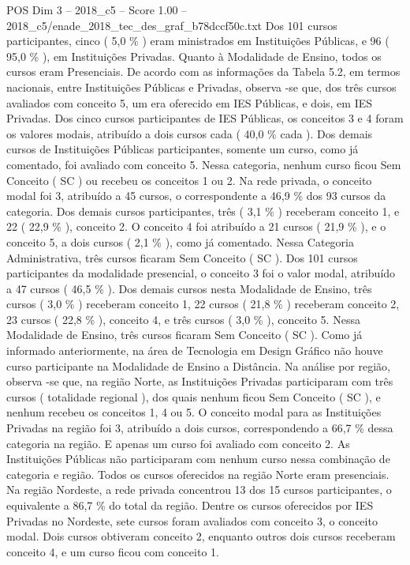 \begin{textsample}{POS Dim 3 – 2018\_c5 – Score 1.00 – 2018\_c5/enade\_2018\_tec\_des\_graf\_b78dccf50c.txt}
Dos 101 cursos participantes, cinco ( 5,0 \% ) eram ministrados em Instituições Públicas, e 96 ( 95,0 \% ), em Instituições Privadas.
Quanto à Modalidade de Ensino, todos os cursos eram Presenciais.
De acordo com as informações da Tabela 5.2, em termos nacionais, entre Instituições Públicas e Privadas, observa -se que, dos três cursos avaliados com conceito 5, um era oferecido em IES Públicas, e dois, em IES Privadas.
Dos cinco cursos participantes de IES Públicas, os conceitos 3 e 4 foram os valores modais, atribuído a dois cursos cada ( 40,0 \% cada ).
Dos demais cursos de Instituições Públicas participantes, somente um curso, como já comentado, foi avaliado com conceito 5.
Nessa categoria, nenhum curso ficou Sem Conceito ( SC ) ou recebeu os conceitos 1 ou 2.
Na rede privada, o conceito modal foi 3, atribuído a 45 cursos, o correspondente a 46,9 \% dos 93 cursos da categoria.
Dos demais cursos participantes, três ( 3,1 \% ) receberam conceito 1, e 22 ( 22,9 \% ), conceito 2.
O conceito 4 foi atribuído a 21 cursos ( 21,9 \% ), e o conceito 5, a dois cursos ( 2,1 \% ), como já comentado.
Nessa Categoria Administrativa, três cursos ficaram Sem Conceito ( SC ).
Dos 101 cursos participantes da modalidade presencial, o conceito 3 foi o valor modal, atribuído a 47 cursos ( 46,5 \% ).
Dos demais cursos nesta Modalidade de Ensino, três cursos ( 3,0 \% ) receberam conceito 1, 22 cursos ( 21,8 \% ) receberam conceito 2, 23 cursos ( 22,8 \% ), conceito 4, e três cursos ( 3,0 \% ), conceito 5.
Nessa Modalidade de Ensino, três cursos ficaram Sem Conceito ( SC ).
Como já informado anteriormente, na área de Tecnologia em Design Gráfico não houve curso participante na Modalidade de Ensino a Distância.
Na análise por região, observa -se que, na região Norte, as Instituições Privadas participaram com três cursos ( totalidade regional ), dos quais nenhum ficou Sem Conceito ( SC ), e nenhum recebeu os conceitos 1, 4 ou 5.
O conceito modal para as Instituições Privadas na região foi 3, atribuído a dois cursos, correspondendo a 66,7 \% dessa categoria na região.
E apenas um curso foi avaliado com conceito 2.
As Instituições Públicas não participaram com nenhum curso nessa combinação de categoria e região.
Todos os cursos oferecidos na região Norte eram presenciais.
Na região Nordeste, a rede privada concentrou 13 dos 15 cursos participantes, o equivalente a 86,7 \% do total da região.
Dentre os cursos oferecidos por IES Privadas no Nordeste, sete cursos foram avaliados com conceito 3, o conceito modal.
Dois cursos obtiveram conceito 2, enquanto outros dois cursos receberam conceito 4, e um curso ficou com conceito 1.

\end{textsample}
